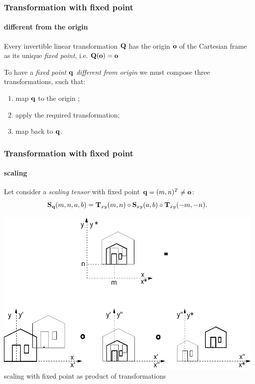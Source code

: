 \documentclass{beamer}
\begin{document}
\begin{frame}\frametitle{Transformation with fixed point}
\framesubtitle{different from the origin}

\vfill

Every invertible linear transformation ${\bf Q}$ has the origin ${\bf o}$ of the Cartesian frame as its unique \emph{fixed point}, i.e. ${\bf Q}({\bf o}) = {\bf o}$

\vfill

To have a \emph{fixed point ${\bf q}$ different from origin} we must compose three transformations, such that:

\vfill

\begin{enumerate}
\vfill\item map ${\bf q}$ to the origin ;
\vfill\item\vspace{-1mm} apply the required transformation;
\vfill\item\vspace{-1mm} map back  to ${\bf q}$.
\end{enumerate}

\vfill
\end{frame}
\begin{frame}\frametitle{Transformation with fixed point}
\framesubtitle{scaling}

\vfill
Let consider a \emph{scaling tensor} with fixed point ${\bf q} =
(m,n)^{T} \not= {\bf o}$:
\[
{\bf S}_{{\bf q}}(m, n, a, b) = {\bf T}_{xy}(m, n)\circ {\bf S}_{xy}(a,
b)\circ {\bf T}_{xy}(-m, -n) .
\]

\vfill

\centering
\includegraphics[width=0.8\linewidth]{images/scala3}
\vfill
scaling with fixed point as product of transformations
\end{frame}
\end{document}
